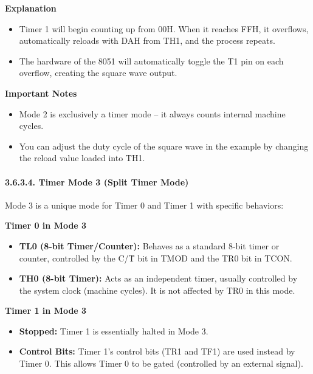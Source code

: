 \documentclass[
]{article}
\begin{document}
\textbf{Explanation}

\begin{itemize}
\item
  Timer 1 will begin counting up from 00H. When it reaches FFH, it
  overflows, automatically reloads with DAH from TH1, and the process
  repeats.
\item
  The hardware of the 8051 will automatically toggle the T1 pin on each
  overflow, creating the square wave output.
\end{itemize}

\textbf{Important Notes}

\begin{itemize}
\item
  Mode 2 is exclusively a timer mode -- it always counts internal
  machine cycles.
\item
  You can adjust the duty cycle of the square wave in the example by
  changing the reload value loaded into TH1.
\end{itemize}

\hypertarget{3634-timer-mode-3-split-timer-mode}{%
\paragraph{3.6.3.4. Timer Mode 3 (Split Timer
Mode)}\label{3634-timer-mode-3-split-timer-mode}}

Mode 3 is a unique mode for Timer 0 and Timer 1 with specific behaviors:

\textbf{Timer 0 in Mode 3}

\begin{itemize}
\item
  \textbf{TL0 (8-bit Timer/Counter):} Behaves as a standard 8-bit timer
  or counter, controlled by the C/T̄ bit in TMOD and the TR0 bit in TCON.
\item
  \textbf{TH0 (8-bit Timer):} Acts as an independent timer, usually
  controlled by the system clock (machine cycles). It is not affected by
  TR0 in this mode.
\end{itemize}

\textbf{Timer 1 in Mode 3}

\begin{itemize}
\item
  \textbf{Stopped:} Timer 1 is essentially halted in Mode 3.
\item
  \textbf{Control Bits:} Timer 1's control bits (TR1 and TF1) are used
  instead by Timer 0. This allows Timer 0 to be gated (controlled by an
  external signal).
\end{itemize}
\end{document}
